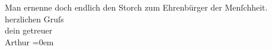 \begin{ledgroupsized}[t]{13cm}
           \pstart
           Man ernenne doch endlich den Storch zum Ehrenbürger der Menſchheit.\pend
           \pstart
           herzlichen Gruſs{\\[\baselineskip]}dein getreuer{\\[\baselineskip]}\spacefill\mbox{Arthur}\pend
           \leftskip=0em{}\endnumbering{}\end{ledgroupsized}  \newcommand{\dateiname}{L01287}\newcommand{\titel}{Arthur Schnitzler an Hermann Bahr, 6. 4. 1903}\newcommand{\editorInnen}{ Kurt Ifkovits,  Martin Anton Müller}
      